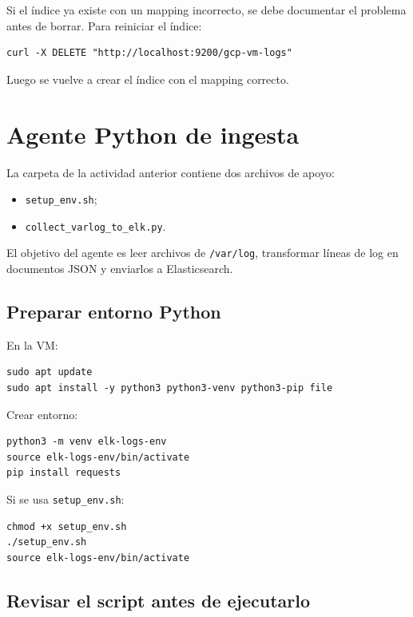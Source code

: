 \documentclass[
  coursetitle={Cómputo Nube y Tecnologías Emergentes},
  coursehours={96},
  coursedate={Verano 2026},
  doctype={Práctica},
  otherlangs={english,french},
  authorname={Lázaro},
  authorsurname={Bustio-Martínez},
  authortitle={PhD},
  role={Profesor Investigador},
  email={lbustio@inaoe.mx},
  phone={5559504000},
  ext={7459},
  institution={Instituto Nacional de Astrofísica, Óptica y Electrónica (INAOE)},
  department={Maestría en Ciencias en Tecnologías de Seguridad},
  address={Luis Enrique Erro 1, Sta. Ma. Tonantzintla, San Andrés Cholula, CP 72840, Puebla, México},
  margin={0.5in}
]{../../lbustio_lecture_notes}
\begin{document}
Si el índice ya existe con un mapping incorrecto, se debe documentar el problema antes de borrar. Para reiniciar el índice:

\begin{lstlisting}
curl -X DELETE "http://localhost:9200/gcp-vm-logs"
\end{lstlisting}

Luego se vuelve a crear el índice con el mapping correcto.

\section{Agente Python de ingesta}

La carpeta de la actividad anterior contiene dos archivos de apoyo:

\begin{itemize}
    \item \texttt{setup\_env.sh};
    \item \texttt{collect\_varlog\_to\_elk.py}.
\end{itemize}

El objetivo del agente es leer archivos de \texttt{/var/log}, transformar líneas de log en documentos JSON y enviarlos a Elasticsearch.

\subsection{Preparar entorno Python}

En la VM:

\begin{lstlisting}
sudo apt update
sudo apt install -y python3 python3-venv python3-pip file
\end{lstlisting}

Crear entorno:

\begin{lstlisting}
python3 -m venv elk-logs-env
source elk-logs-env/bin/activate
pip install requests
\end{lstlisting}

Si se usa \texttt{setup\_env.sh}:

\begin{lstlisting}
chmod +x setup_env.sh
./setup_env.sh
source elk-logs-env/bin/activate
\end{lstlisting}

\subsection{Revisar el script antes de ejecutarlo}
\end{document}

